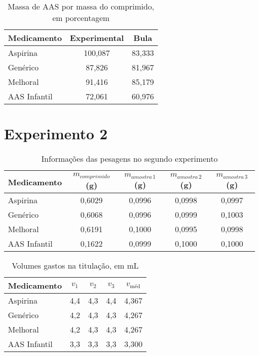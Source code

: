 \begin{table}[H]\label{porcentagem1}
    \centering
    \begin{tabular}{l c c}
        \toprule
        Medicamento & Experimental & Bula \\
        \midrule
        Aspirina\R     & 100,087 & 83,333 \\
        Genérico     & 87,826  & 81,967 \\
        Melhoral     & 91,416  & 85,179 \\
        AAS Infantil & 72,061  & 60,976 \\
        \bottomrule
    \end{tabular}
    \caption{Massa de AAS por massa do comprimido, em porcentagem}
\end{table}

\section{Experimento 2}\label{res_exp2}

\begin{table}[H]\label{t:peso_2}
    \centering
    \begin{tabular}{l c c c c}
       \toprule
       Medicamento & $m_{comprimido}$ (g) &$m_{amostra \, 1}$ (g) &
       $m_{amostra \, 2}$ (g) & $m_{amostra\, 3}$ (g)\\
       \midrule
       Aspirina\R     & 0,6029 & 0,0996 & 0,0998 & 0,0997  \\
       Genérico     & 0,6068 & 0,0996 & 0,0999 & 0,1003  \\
       Melhoral     & 0,6191 & 0,1000 & 0,0995 & 0,0998 \\
       AAS Infantil & 0,1622 & 0,0999 & 0,1000 & 0,1000 \\
        \bottomrule
    \end{tabular}
    \caption{Informações das pesagens no segundo experimento}
\end{table}

\begin{table}[H]\label{titulacao_exp2}
    \centering
    \begin{tabular}{l c c c c}

        \toprule
        Medicamento & $v_1$  & $v_2$ & $v_3$ &  $v_{\textrm{méd}}$ \\
        \midrule
        Aspirina\R   & 4,4 & 4,3 & 4,4 & 4,367 \\
        Genérico     & 4,2 & 4,3 & 4,3 & 4,267 \\
        Melhoral     & 4,2 & 4,3 & 4,3 & 4,267 \\
        AAS Infantil & 3,3 & 3,3 & 3,3 & 3,300 \\
       \bottomrule

    \end{tabular}
    \caption{Volumes gastos na titulação, em mL}
\end{table}

